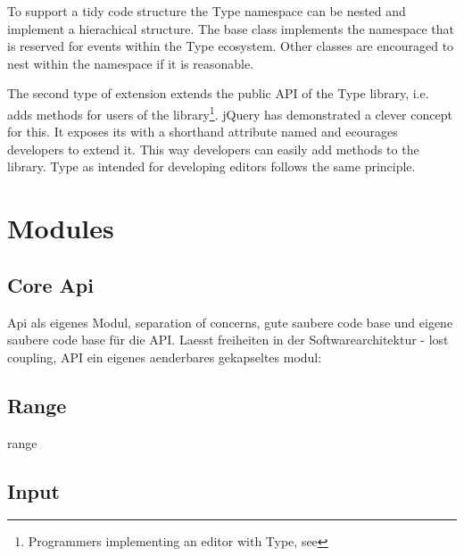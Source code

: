 To support a tidy code structure the Type namespace can be nested and implement a hierachical structure. The  base class implements the namespace  that is reserved for events within the Type ecosystem. Other classes are encouraged to nest within the namespace if it is reasonable.

The second type of extension extends the public API of the Type library, i.e. adds methods for users of the library\footnote{Programmers implementing an editor with Type, see }. jQuery has demonstrated a clever concept for this. It exposes its  with a shorthand attribute named  and ecourages developers to extend it. This way developers can easily add methods to the library. Type as intended for developing editors follows the same principle.


\section{Modules}
\label{sec:modules}

\subsection{Core Api}

Api als eigenes Modul, separation of concerns, gute saubere code base und eigene saubere code base für die API. Laesst freiheiten in der Softwarearchitektur - lost coupling, API ein eigenes aenderbares gekapseltes modul:



\subsection{Range}
range



\subsection{Input}



